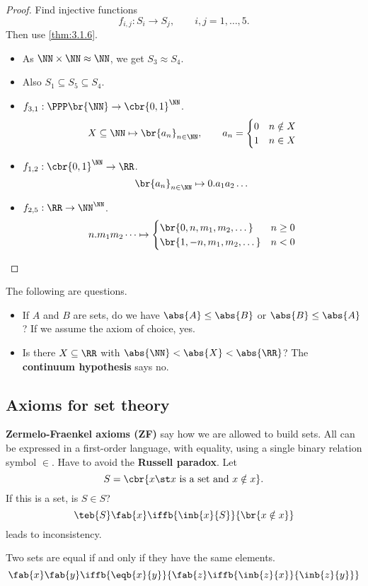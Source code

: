 \begin{proof}
Find injective functions
$$ f_{i, j} : S_i \to S_j, \qquad i, j = 1, \dots, 5. $$
Then use \ref{thm:3.1.6}.
\begin{itemize}
\item As $ \NN \times \NN \approx \NN $, we get $ S_3 \approx S_4 $.
\item Also $ S_1 \subseteq S_5 \subseteq S_4 $.
\item $ f_{3, 1} : \PPP\br{\NN} \to \cbr{0, 1}^\NN $.
$$ X \subseteq \NN \mapsto \br{a_n}_{n \in \NN}, \qquad a_n =
\begin{cases}
0 & n \notin X \\
1 & n \in X
\end{cases}
$$
\item $ f_{1, 2} : \cbr{0, 1}^\NN \to \RR $.
$$ \br{a_n}_{n \in \NN} \mapsto 0 . a_1a_2 \dots $$
\item $ f_{2, 5} : \RR \to \NN^\NN $.
$$ n . m_1m_2 \dots \mapsto
\begin{cases}
\br{0, n, m_1, m_2, \dots} & n \ge 0 \\
\br{1, -n, m_1, m_2, \dots} & n < 0
\end{cases}
$$
\end{itemize}
\end{proof}

The following are questions.
\begin{itemize}
\item If $ A $ and $ B $ are sets, do we have $ \abs{A} \le \abs{B} $ or $ \abs{B} \le \abs{A} $? If we assume the axiom of choice, yes.
\item Is there $ X \subseteq \RR $ with $ \abs{\NN} < \abs{X} < \abs{\RR} $? The \textbf{continuum hypothesis} says no.
\end{itemize}

\subsection{Axioms for set theory}

\textbf{Zermelo-Fraenkel axioms (ZF)} say how we are allowed to build sets. All can be expressed in a first-order language, with equality, using a single binary relation symbol $ \in $. Have to avoid the \textbf{Russell paradox}. Let
$$ S = \cbr{x \st x \ \text{is a set and} \ x \notin x}. $$
If this is a set, is $ S \in S $?
$$ \teb{S}\fab{x}\iffb{\inb{x}{S}}{\br{x \notin x}} $$
leads to inconsistency.

\begin{axiom**}
Two sets are equal if and only if they have the same elements.
$$ \fab{x}\fab{y}\iffb{\eqb{x}{y}}{\fab{z}\iffb{\inb{z}{x}}{\inb{z}{y}}} $$
\end{axiom**}

